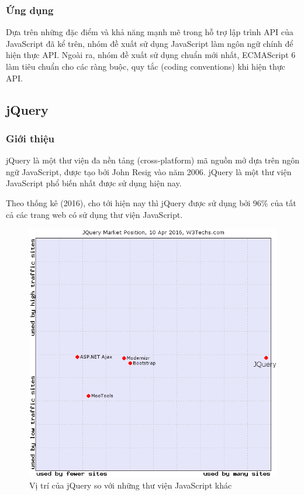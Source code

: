 \documentclass[12pt,a4paper]{article}
\begin{document}
\subsubsection{Ứng dụng}
Dựa trên những đặc điểm và khả năng mạnh mẽ trong hỗ trợ lập trình API của JavaScript đã kể trên, nhóm đề xuất sử dụng JavaScript làm ngôn ngữ chính để hiện thực API.
Ngoài ra, nhóm đề xuất sử dụng chuẩn mới nhất, ECMAScript 6 làm tiêu chuẩn cho các ràng buộc, quy tắc (coding conventions) khi hiện thực API.

\subsection{jQuery}
\subsubsection{Giới thiệu}
jQuery\cite{jqueryintro1}\cite{jqueryintro2} là một thư viện đa nền tảng (cross-platform) mã nguồn mở dựa trên ngôn ngữ JavaScript, được tạo bởi John Resig vào năm 2006. jQuery là một thư viện JavaScript phổ biến nhất được sử dụng hiện nay.

Theo thống kê (2016)\cite{jqueryusage}, cho tới hiện nay thì jQuery được sử dụng bởi 96\% của tất cả các trang web có sử dụng thư viện JavaScript.

\begin{figure}[htp]
    \begin{center}
     \includegraphics[scale=.6]{image/js-jquery}
    \end{center}
    \caption{Vị trí của jQuery so với những thư viện JavaScript khác}
    \label{refhinh13}
\end{figure}
\end{document}
